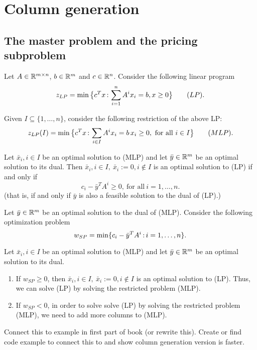 \documentclass[../open-optimization/open-optimization.tex]{subfiles}
\begin{document}
\section{Column generation}
\subsection{The master problem and the pricing subproblem}
Let $A\in{\mathbb{R}}^{m\times n}$, $b\in{\mathbb{R}}^m$ and $c\in{\mathbb{R}}^n$. Consider the following linear program
$$z_{LP}=\min\big\{c^Tx{\,:\,} \sum_{i=1}^nA^ix_i=b, x\geq0\big\}\qquad (LP).$$

\begin{definition}
Given $I\subseteq \{1,\dots, n\}$,  consider the following restriction of the above LP:
$$z_{LP}(I)=\min\big\{c^Tx{\,:\,} \sum_{i\in I}A^ix_i=b\, x_i\geq0,\ \text{for all}\ i\in I\big\}\qquad (MLP).$$
\end{definition}

Let $\bar x_i,i\in I$ be an optimal solution to (MLP) and let $\bar y\in{\mathbb{R}}^m$ be an optimal solution to its dual. Then $\bar x_i,i\in I,\ \bar x_i:=0,i\notin I$ is an optimal solution to (LP) if and only if
$$c_i-\bar y^TA^i\geq 0,\ \text{for all}\ i=1,\dots,n.$$ 
(that is, if and only if $\bar y$ is also a feasible solution to the dual of (LP).)

\begin{definition} Let $\bar y\in{\mathbb{R}}^m$ be an optimal solution to the dual of (MLP). Consider the following optimization problem
$$w_{SP}=\min\{c_i-\bar y^TA^i{\,:\,} i=1,\dots, n\}.$$
\end{definition}

\begin{theorem} Let $\bar x_i,i\in I$ be an optimal solution to (MLP) and let $\bar y\in{\mathbb{R}}^m$ be an optimal solution to its dual.
\begin{enumerate}
\item  If $w_{SP}\geq 0$, then $\bar x_i,i\in I,\ \bar x_i:=0,i\notin I$ is an optimal solution to (LP). Thus, we can solve (LP) by solving the restricted problem (MLP).
\item  If $w_{SP}< 0$, in order to solve solve (LP) by solving the restricted problem (MLP), we need to add more columns to (MLP).
\end{enumerate}
\end{theorem}

\begin{todo}
Connect this to example in first part of book (or rewrite this).  Create or find code example to connect this to and show column generation version is faster.
\end{todo}
\end{document}

